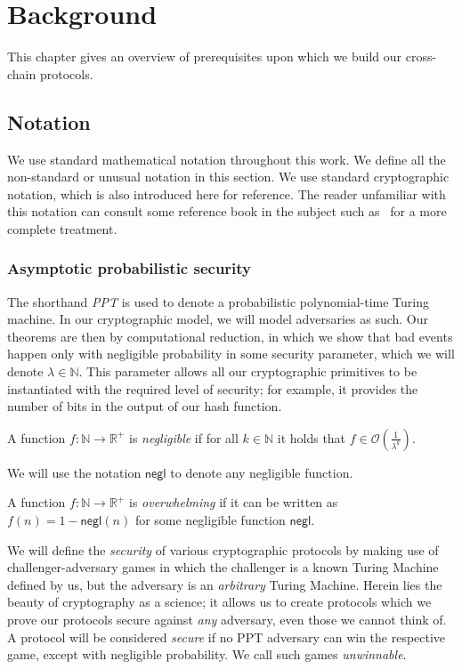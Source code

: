 \chapter{Background}\label{chapter:background}

This chapter gives an overview of prerequisites upon which we build our
cross-chain protocols.

\section{Notation}
We use standard mathematical notation throughout this work. We define all the
non-standard or unusual notation in this section. We use standard cryptographic
notation, which is also introduced here for reference. The reader unfamiliar
with this notation can consult some reference book in the subject such
as~\cite{katz} for a more complete treatment.

\subsection{Asymptotic probabilistic security}
The shorthand \emph{PPT} is used to denote a probabilistic polynomial-time
Turing machine. In our cryptographic model, we will model adversaries as such.
Our theorems are then by computational reduction, in which we show that bad
events happen only with negligible probability in some security parameter, which
we will denote $\lambda \in \mathbb{N}$. This parameter allows all our
cryptographic primitives to be instantiated with the required level of security;
for example, it provides the number of bits in the output of our hash function.

\begin{definition}[Negligible]
  A function $f: \mathbb{N} \longrightarrow \mathbb{R}^+$ is
  \emph{negligible} if for all $k \in \mathbb{N}$ it holds that
  $f \in \mathcal{O}(\frac{1}{\lambda^k})$.
\end{definition}

We will use the notation $\textsf{negl}$ to denote any negligible function.

\begin{definition}[Overwhelming]
  A function $f: \mathbb{N} \longrightarrow \mathbb{R}^+$ is
  \emph{overwhelming} if it can be written as $f(n) = 1 - \textsf{negl}(n)$ for
  some negligible function $\textsf{negl}$.
\end{definition}

We will define the \emph{security} of various cryptographic protocols by making use of challenger-adversary games in which the challenger is a known Turing Machine defined by us, but the adversary is an \emph{arbitrary} Turing Machine. Herein lies the beauty of cryptography as a science; it allows us to create protocols which we prove our protocols secure against \emph{any} adversary, even those we cannot think of. A protocol will be considered \emph{secure} if no PPT adversary can win the respective game, except with negligible probability. We call such games \emph{unwinnable}.

